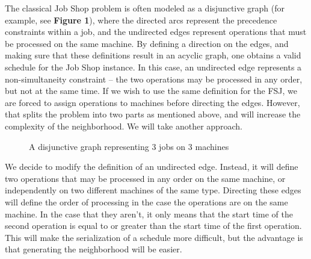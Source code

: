 \documentclass[a4paper,12pt]{article}
\begin{document}
The classical Job Shop problem is often modeled as a disjunctive graph (for example, see \textbf{Figure 1}), where the directed arcs represent the precedence constraints within a job, and the undirected edges represent operations that must be processed on the same machine. By defining a direction on the edges, and making sure that these definitions result in an acyclic graph, one obtains a valid schedule for the Job Shop instance. In this case, an undirected edge represents a non-simultaneity constraint -- the two operations may be processed in any order, but not at the same time. If we wish to use the same definition for the FSJ, we are forced to assign operations to machines before directing the edges. However, that splits the problem into two parts as mentioned above, and will increase the complexity of the neighborhood. We will take another approach.

\begin{figure}
\centering
{}
\caption{A disjunctive graph representing 3 jobs on 3 machines}
\end{figure}

We decide to modify the definition of an undirected edge. Instead, it will define two operations that may be processed in any order on the same machine, or independently on two different machines of the same type. Directing these edges will define the order of processing in the case the operations are on the same machine. In the case that they aren't, it only means that the start time of the second operation is equal to or greater than the start time of the first operation. This will make the serialization of a schedule more difficult, but the advantage is that generating the neighborhood will be easier.
\end{document}
